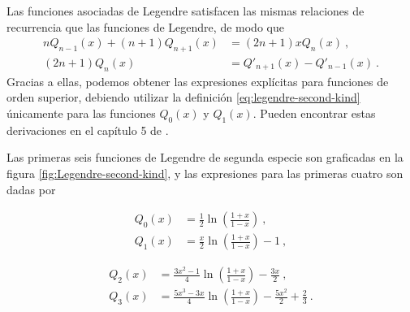 
Las funciones asociadas de Legendre satisfacen las mismas relaciones de recurrencia que las funciones de Legendre, de modo que
\begin{align}
    nQ_{n-1}(x) + (n+1)Q_{n+1}(x) & = (2n+1) x Q_n(x) \ , \\
    (2n+1)Q_n(x) & = Q'_{n+1}(x) - Q'_{n-1}(x) \ . 
\end{align}
Gracias a ellas, podemos obtener las expresiones explícitas para funciones de orden superior, debiendo utilizar la definición \eqref{eq:legendre-second-kind} únicamente para las funciones $Q_0(x)$ y $Q_1(x)$. Pueden encontrar estas derivaciones en el capítulo 5 de \cite{Rubilar}.

Las primeras seis funciones de Legendre de segunda especie son graficadas en la figura \ref{fig:Legendre-second-kind}, y las expresiones para las primeras cuatro son dadas por

\begin{minipage}[b]{.45\textwidth}
    \begin{align*}
        Q_0(x) & = \frac{1}{2} \ln\left( \frac{1+x}{1-x} \right) \ , \\
        Q_1(x) & = \frac{x}{2} \ln\left( \frac{1+x}{1-x} \right) - 1 \ ,
    \end{align*}
\end{minipage}
\hfill
\begin{minipage}[b]{.5\textwidth}
    \begin{align*}
        Q_2(x) & = \frac{3x^2-1}{4}\ln\left( \frac{1+x}{1-x} \right) - \frac{3x}{2} \ , \\
        Q_3(x) & = \frac{5x^3 - 3x}{4}\ln\left( \frac{1+x}{1-x} \right) - \frac{5x^2}{2} + \frac{2}{3} \ . 
    \end{align*}
\end{minipage}

